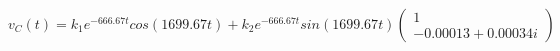 \documentclass[preview]{standalone}
\begin{document}
\begin{center}
$v_C(t) = k_1e^{-666.67t}cos(1699.67t) + k_2e^{-666.67t}sin(1699.67t)\begin{pmatrix} 1 \\ -0.00013 + 0.00034i \end{pmatrix}$
\end{center}
\end{document}
